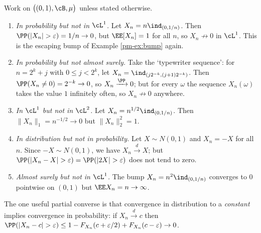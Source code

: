\begin{center}
\end{center}

\begin{example}\label{ex:mode-counter}
	Work on $\big((0,1),\cB,\mu\big)$ unless stated otherwise.
	\begin{enumerate}[label=(\roman*)]
		\item \emph{In probability but not in $\cL^1$.} Let $X_n = n\ind_{(0,1/n)}$. Then $\PP(|X_n|>\varepsilon)=1/n\to0$, but $\EE[X_n]=1$ for all $n$, so $X_n \not\to0$ in $\cL^1$. This is the escaping bump of Example \ref{pm-ex:bump} again.
		\item \emph{In probability but not almost surely.} Take the `typewriter sequence': for $n = 2^k + j$ with $0 \leq j < 2^k$, let $X_n = \ind_{(j2^{-k},(j+1)2^{-k})}$. Then $\PP(X_n \neq 0)=2^{-k}\to0$, so $X_n \xrightarrow{\PP}0$; but for every $\omega$ the sequence $X_n(\omega)$ takes the value $1$ infinitely often, so $X_n \not\to 0$ anywhere.
		\item \emph{In $\cL^1$ but not in $\cL^2$.} Let $X_n = n^{1/2}\ind_{(0,1/n)}$. Then $\|X_n\|_1 = n^{-1/2}\to0$ but $\|X_n\|_2^2 = 1$.
		\item \emph{In distribution but not in probability.} Let $X \sim N(0,1)$ and $X_n = -X$ for all $n$. Since $-X\sim N(0,1)$, we have $X_n \xrightarrow{d}X$; but $\PP(|X_n - X|>\varepsilon)=\PP(|2X|>\varepsilon)$ does not tend to zero.
		\item \emph{Almost surely but not in $\cL^1$.} The bump $X_n = n^2\ind_{(0,1/n)}$ converges to $0$ pointwise on $(0,1)$ but $\EE X_n = n \to\infty$.
	\end{enumerate}
\end{example}

The one useful partial converse is that convergence in distribution to a \emph{constant} implies convergence in probability: if $X_n \xrightarrow{d} c$ then $\PP(|X_n - c|>\varepsilon)\leq 1 - F_{X_n}(c+\varepsilon/2)+F_{X_n}(c-\varepsilon)\to 0$.

